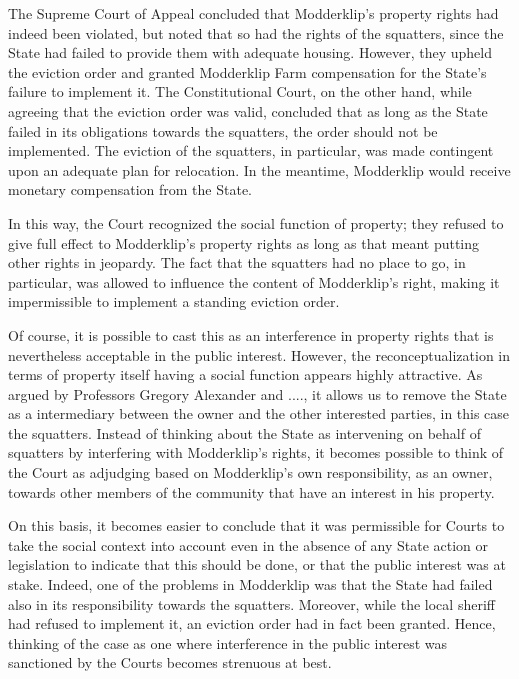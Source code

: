 The Supreme Court of Appeal concluded that Modderklip's property rights had indeed been violated, but noted that so had the rights of the squatters, since the State had failed to provide them with adequate housing. However, they upheld the eviction order and granted Modderklip Farm compensation for the State's failure to implement it. The Constitutional Court, on the other hand, while agreeing that the eviction order was valid, concluded that as long as the State failed in its obligations towards the squatters, the order should not be implemented. The eviction of the squatters, in particular, was made contingent upon an adequate plan for relocation. In the meantime, Modderklip would receive monetary compensation from the State.

In this way, the Court recognized the social function of property; they refused to give full effect to Modderklip's property rights as long as that meant putting other rights in jeopardy. The fact that the squatters had no place to go, in particular, was allowed to influence the content of Modderklip's right, making it impermissible to implement a standing eviction order. 

Of course, it is possible to cast this as an interference in property rights that is nevertheless acceptable in the public interest. However, the reconceptualization in terms of property itself having a social function appears highly attractive. As argued by Professors Gregory Alexander and ...., it allows us to remove the State as a intermediary between the owner and the other interested parties, in this case the squatters. Instead of thinking about the State as intervening on behalf of squatters by interfering with Modderklip's rights, it becomes possible to think of the Court as adjudging based on Modderklip's own responsibility, as an owner, towards other members of the community that have an interest in his property. 

On this basis, it becomes easier to conclude that it was permissible for Courts to take the social context into account even in the absence of any State action or legislation to indicate that this should be done, or that the public interest was at stake. Indeed, one of the problems in Modderklip was that the State had failed also in its responsibility towards the squatters. Moreover, while the local sheriff had refused to implement it, an eviction order had in fact been granted. Hence, thinking of the case as one where interference in the public interest was sanctioned by the Courts becomes strenuous at best.

